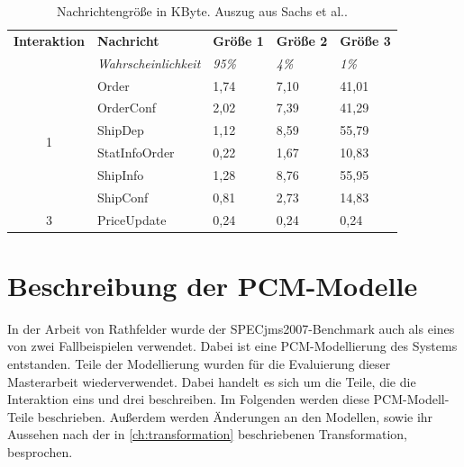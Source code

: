 \begin{table}
\center
  \begin{tabular}{|c|l|l|l|l|}
  \hline
    \textbf{Interaktion} & \textbf{Nachricht} & \textbf{Größe 1} & \textbf{Größe 2} &\textbf{Größe 3} \\
     & \textit{Wahrscheinlichkeit} & \textit{95\%}  & \textit{4\%} &\textit{1\%}   \\
    \hline \hline
    \multirow{6}{*}{1} & Order & 1,74 & 7,10 & 41,01 \\\cline{2-5}
    & OrderConf & 2,02 & 7,39 & 41,29 \\\cline{2-5}
    & ShipDep & 1,12 & 8,59 & 55,79\\\cline{2-5}
    & StatInfoOrder & 0,22 & 1,67 & 10,83 \\\cline{2-5}
    & ShipInfo & 1,28 & 8,76 & 55,95 \\\cline{2-5}
    & ShipConf & 0,81 & 2,73 & 14,83  \\\hline
    \hline
     3 & PriceUpdate & 0,24 & 0,24 & 0,24 \\\hline
  \end{tabular}
	\caption{\label{tab:msgpropandsize} Nachrichtengröße in KByte. Auszug aus Sachs et al.\cite{Sachs2013}.}
\end{table}

\section{Beschreibung der PCM-Modelle}
\label{sec:specjmsmodell}
In der Arbeit von Rathfelder \cite{Rathfelder2013} wurde der SPECjms2007-Benchmark auch als eines von zwei Fallbeispielen verwendet. Dabei ist eine PCM-Modellierung des Systems entstanden. Teile der Modellierung wurden für die Evaluierung dieser Masterarbeit wiederverwendet. Dabei handelt es sich um die Teile, die die Interaktion eins und drei beschreiben. Im Folgenden werden diese PCM-Modell-Teile beschrieben. Außerdem werden Änderungen an den Modellen, sowie ihr Aussehen nach der in \autoref{ch:transformation} beschriebenen Transformation, besprochen. 

